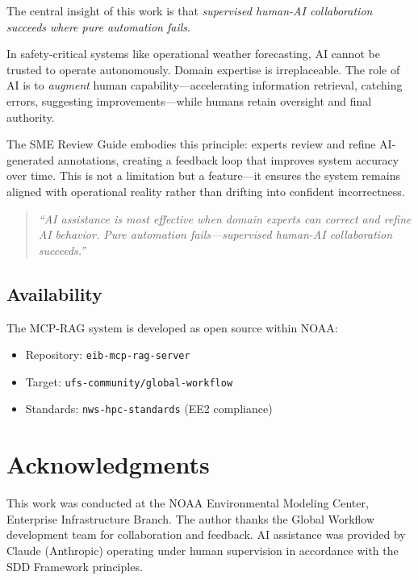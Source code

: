 \documentclass[11pt,letterpaper]{article}
\begin{document}
The central insight of this work is that \textit{supervised human-AI collaboration succeeds where pure automation fails}.

In safety-critical systems like operational weather forecasting, AI cannot be trusted to operate autonomously. Domain expertise is irreplaceable. The role of AI is to \textit{augment} human capability---accelerating information retrieval, catching errors, suggesting improvements---while humans retain oversight and final authority.

The SME Review Guide embodies this principle: experts review and refine AI-generated annotations, creating a feedback loop that improves system accuracy over time. This is not a limitation but a feature---it ensures the system remains aligned with operational reality rather than drifting into confident incorrectness.

\begin{quote}
\textit{``AI assistance is most effective when domain experts can correct and refine AI behavior. Pure automation fails---supervised human-AI collaboration succeeds.''}
\end{quote}

\subsection{Availability}

The MCP-RAG system is developed as open source within NOAA:

\begin{itemize}
    \item Repository: \texttt{eib-mcp-rag-server}
    \item Target: \texttt{ufs-community/global-workflow}
    \item Standards: \texttt{nws-hpc-standards} (EE2 compliance)
\end{itemize}

\section*{Acknowledgments}

This work was conducted at the NOAA Environmental Modeling Center, Enterprise Infrastructure Branch. The author thanks the Global Workflow development team for collaboration and feedback. AI assistance was provided by Claude (Anthropic) operating under human supervision in accordance with the SDD Framework principles.
\end{document}
